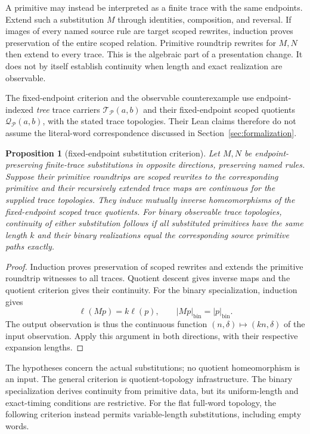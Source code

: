 \documentclass[10pt,reqno]{amsart}
\theoremstyle{definition}
\theoremstyle{plain}
\newtheorem{proposition}[definition]{Proposition}
\theoremstyle{remark}
\begin{document}
A primitive may instead be interpreted as a finite trace with the same
endpoints. Extend such a substitution $M$ through identities, composition,
and reversal. If images of every named source rule are target scoped
rewrites, induction proves preservation of the entire scoped relation.
Primitive roundtrip rewrites for $M,N$ then extend to every trace. This is
the algebraic part of a presentation change. It does not by itself establish
continuity when length and exact realization are observable.

The fixed-endpoint criterion and the observable counterexample use endpoint-indexed \emph{tree} trace carriers
$\mathcal T_{\mathcal P}(a,b)$ and their fixed-endpoint scoped quotients
$\mathcal Q_{\mathcal P}(a,b)$, with the stated trace topologies. Their Lean
claims therefore do not assume the literal-word correspondence discussed in
Section~\ref{sec:formalization}.

\begin{proposition}[fixed-endpoint substitution criterion]
\label{prop:word-substitution-criterion}
Let $M,N$ be endpoint-preserving finite-trace substitutions in opposite
directions, preserving named rules. Suppose their primitive roundtrips are
scoped rewrites to the corresponding primitive and their recursively
extended trace maps are continuous for the supplied trace topologies.
They induce mutually inverse homeomorphisms of the fixed-endpoint scoped
trace quotients.
For binary observable trace topologies, continuity of either substitution
follows if all substituted primitives have the same length $k$ and their
binary realizations equal the corresponding source primitive paths exactly.
\end{proposition}
\begin{proof}
Induction proves preservation of scoped rewrites and extends the primitive
roundtrip witnesses to all traces. Quotient descent gives inverse maps and
the quotient criterion gives their continuity. For the binary specialization,
induction gives
\[
  \ell(Mp)=k\ell(p),\qquad |Mp|_{\mathrm{bin}}=|p|_{\mathrm{bin}}.
\]
The output observation is thus the continuous function
$(n,\delta)\mapsto(kn,\delta)$ of the input observation. Apply this argument
in both directions, with their respective expansion lengths.
\end{proof}

The hypotheses concern the actual substitutions; no quotient homeomorphism
is an input. The general criterion is quotient-topology infrastructure. The
binary specialization derives continuity from primitive data, but its
uniform-length and exact-timing conditions are restrictive. For the flat
full-word topology, the following criterion instead permits variable-length
substitutions, including empty words.
\end{document}

